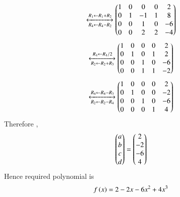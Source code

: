 \begin{align}
\xleftrightarrow[R_4\leftarrow R_4-R_2]{R_1\leftarrow R_1+R_2}
\begin{pmatrix}1&0&0&0&2\\0&1&-1&1&8\\0&0&1&0&-6\\0&0&2&2&-4\end{pmatrix}
\end{align}
\begin{align}
\xleftrightarrow[R_2\leftarrow R_2+R_3]{R_4\leftarrow R_4/2}
\begin{pmatrix}1&0&0&0&2\\0&1&0&1&2\\0&0&1&0&-6\\0&0&1&1&-2\end{pmatrix}
\end{align}
\begin{align}
\xleftrightarrow[R_2\leftarrow R_2-R_4]{R_4\leftarrow R_4-R_3}
\begin{pmatrix}1&0&0&0&2\\0&1&0&0&-2\\0&0&1&0&-6\\0&0&0&1&4\end{pmatrix}
\end{align}
Therefore ,
\begin{align}
    \begin{pmatrix}a\\b\\c\\d\end{pmatrix}=\begin{pmatrix}2\\-2\\-6\\4\end{pmatrix}
\end{align}
Hence required polynomial is
\begin{align}
f\left(x\right)=2-2x-6x^{2}+4x^{3}    
\end{align}


